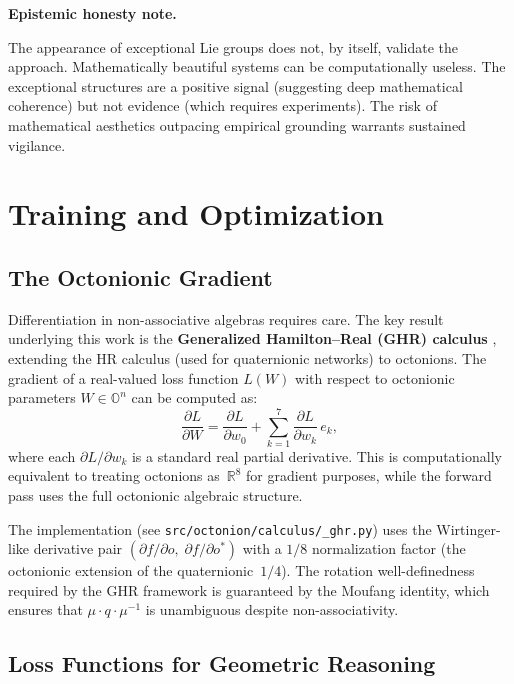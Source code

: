 \documentclass[11pt,a4paper]{article}
\newcommand{\Oct}{\mathbb{O}}
\newcommand{\Real}{\mathbb{R}}
\newenvironment{epistemicnote}{%
  \medskip\noindent\textbf{Epistemic honesty note.}\itshape\space
}{%
  \medskip
}
\begin{document}
\begin{epistemicnote}
The appearance of exceptional Lie groups does not, by itself, validate the approach. Mathematically beautiful systems can be computationally useless. The exceptional structures are a positive signal (suggesting deep mathematical coherence) but not evidence (which requires experiments). The risk of mathematical aesthetics outpacing empirical grounding warrants sustained vigilance.
\end{epistemicnote}

\section{Training and Optimization}
\label{sec:training}

\subsection{The Octonionic Gradient}

Differentiation in non-associative algebras requires care. The key result underlying this work is the \textbf{Generalized Hamilton--Real (GHR) calculus} \citep{Xu2015}, extending the HR calculus (used for quaternionic networks) to octonions. The gradient of a real-valued loss function $L(W)$ with respect to octonionic parameters $W \in \Oct^n$ can be computed as:
\begin{equation}
\frac{\partial L}{\partial W} = \frac{\partial L}{\partial w_0} + \sum_{k=1}^{7} \frac{\partial L}{\partial w_k}\, e_k,
\end{equation}
where each $\partial L / \partial w_k$ is a standard real partial derivative. This is computationally equivalent to treating octonions as~$\Real^8$ for gradient purposes, while the forward pass uses the full octonionic algebraic structure.

The implementation (see \texttt{src/octonion/calculus/\_ghr.py}) uses the Wirtinger-like derivative pair $(\partial f / \partial o,\; \partial f / \partial o^*)$ with a $1/8$ normalization factor (the octonionic extension of the quaternionic~$1/4$). The rotation well-definedness required by the GHR framework is guaranteed by the Moufang identity, which ensures that $\mu \cdot q \cdot \mu^{-1}$ is unambiguous despite non-associativity.

\subsection{Loss Functions for Geometric Reasoning}
\end{document}
